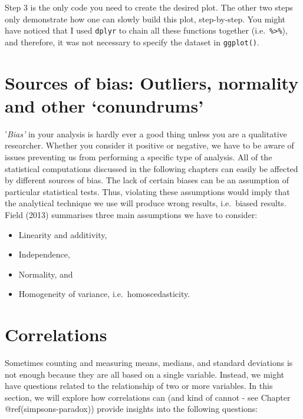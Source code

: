 \documentclass[
  letterpaper,
]{krantz}
\begin{document}
Step 3 is the only code you need to create the desired plot. The other
two steps only demonstrate how one can slowly build this plot,
step-by-step. You might have noticed that I used \texttt{dplyr} to chain
all these functions together (i.e.~\texttt{\%\textgreater{}\%}), and
therefore, it was not necessary to specify the dataset in
\texttt{ggplot()}.


\chapter{Sources of bias: Outliers, normality and other
`conundrums'}\label{sources-of-bias}

'\emph{Bias'} in your analysis is hardly ever a good thing unless you
are a qualitative researcher. Whether you consider it positive or
negative, we have to be aware of issues preventing us from performing a
specific type of analysis. All of the statistical computations discussed
in the following chapters can easily be affected by different sources of
bias. The lack of certain biases can be an assumption of particular
statistical tests. Thus, violating these assumptions would imply that
the analytical technique we use will produce wrong results, i.e.~biased
results. Field (2013) summarises three main assumptions we have to
consider:

\begin{itemize}
\item
  Linearity and additivity,
\item
  Independence,
\item
  Normality, and
\item
  Homogeneity of variance, i.e.~homoscedasticity.
\end{itemize}


\chapter{Correlations}\label{correlations}

Sometimes counting and measuring means, medians, and standard deviations
is not enough because they are all based on a single variable. Instead,
we might have questions related to the relationship of two or more
variables. In this section, we will explore how correlations can (and
kind of cannot - see Chapter @ref(simpsons-paradox)) provide insights
into the following questions:
\end{document}
